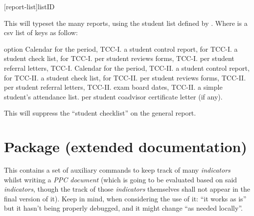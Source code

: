 \documentclass[article,nogeometry,english,tocdepth=3,secdepth=3]{ufrgscca} %
\begin{document}
 
\begin{codedescribe}{\tcreports}
	\begin{codesyntax}%
		\tsmacro{\tcreports}[report-list]{listID}
	\end{codesyntax}
	This will typeset the many reports, using the student list defined by \tsobj[meta]{listID}.
    Where  is a csv list of keys as follow:
\end{codedescribe}

\begin{describelist}{option}
	 { Calendar for the period, TCC-I.}
	 { a student control report, for TCC-I.}
	 { a student check list, for TCC-I.}
	 { per student reviews forms, TCC-I.}
	 { per student referral letters, TCC-I.}
	 { Calendar for the period, TCC-II.}
	 { a student control report, for TCC-II.}
	 { a student check list, for TCC-II.}
	 { per student reviews forms, TCC-II.}
	 { per student referral letters, TCC-II.}
	 { exam board dates, TCC-II.}
	 { a simple student's attendance list.}
	 { per student coadvisor certificate letter (if any).}
\end{describelist}

\begin{codedescribe}[code,new=2024/02/18]{\suppresschecklist}
	\begin{codesyntax}%
		\tsmacro{\suppresschecklist}{}
	\end{codesyntax}
	This will suppress the “student checklist” on the general report.
\end{codedescribe}

\section{ Package (extended documentation)}
This contains a set of auxiliary commands to keep track of many \emph{indicators} whilst writing  a \emph{PPC document} (which is going to be evaluated based on said \emph{indicators}, though the track of those \emph{indicators} themselves shall not appear in the final version of it). Keep in mind, when considering the use of it: “it works as is” but it hasn't being properly debugged, and it might change “as needed locally”.
\end{document}
